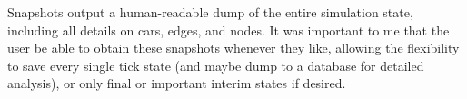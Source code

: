 \par Snapshots output a human-readable dump of the entire simulation state, including all details on cars, edges, and nodes.  It was important to me that the user be able to obtain these snapshots whenever they like, allowing the flexibility to save every single tick state (and maybe dump to a database for detailed analysis), or only final or important interim states if desired.